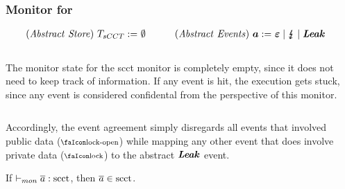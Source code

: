 \documentclass[dvipsnames]{llncs}
\begin{document}
\subsubsection{Monitor for }
\begin{gather*}
  \begin{aligned}
    \mathit{(Abstract\ Store)}~T_{sCCT}{}:=&\ \emptyset 
    &
    \qquad\mathit{(Abstract\ Events)}~\bm{a}:=&\ \bm{\mathit{\varepsilon}} \mid \lightning{\kern-5.5pt}\lightning \mid \bm{\mathit{Leak}} 
  \end{aligned}
\end{gather*}
\begin{center}
  $\;$\\
\end{center}
The monitor state for the \gls*{scct} monitor is completely empty, since it does not need to keep track of information.
If
any event is hit, the execution gets stuck, since any event is considered confidental from the perspective of this monitor.
\begin{center}
  $\;$\\
\end{center}
Accordingly, the event agreement simply disregards all events that involved public data ($\unlock$) while mapping any other event that does involve private data ($\lock$) to the abstract $\bm{\mathit{Leak}}$ event.

\begin{lemma}\label{lem:mon:scctsafe}
  If $\vdash_{mon}{\overline{a}}:{\operatorname{scct}}$, then $\overline{a}\in\operatorname{scct}$. %
\end{lemma}
\end{document}
